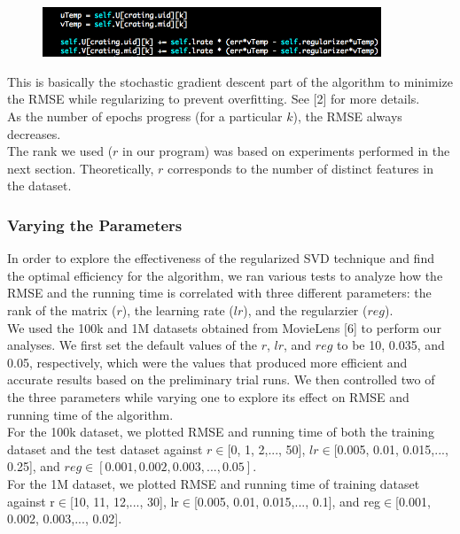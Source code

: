 \documentclass[12pt]{article}
\begin{document}
\begin{figure}[H]
\centering
\includegraphics[width=0.90\textwidth]{graphs/trainkcode}
\end{figure}

\noindent This is basically the stochastic gradient descent part of the algorithm
to minimize the RMSE while regularizing to prevent overfitting. 
See [2] for more details. \\

\noindent As the number of epochs progress (for a particular $k$), the RMSE always decreases.\\

\noindent The rank we used ($r$ in our program) was based on 
experiments performed in the next section. Theoretically, $r$ corresponds
to the number of distinct features in the dataset. 


\subsubsection*{Varying the Parameters}

In order to explore the effectiveness of the regularized SVD technique and find
the optimal efficiency for the algorithm, we ran various tests to analyze how the
RMSE and the running time is correlated with three different parameters: the
rank of the matrix ($r$), the learning rate ($lr$), and the regularzier 
($reg$).\\

\noindent We used the 100k and 1M datasets obtained from MovieLens [6] to perform our analyses.
We first set the default values of the $r$, $lr$, and $reg$ to be 10, 0.035, and 0.05,
respectively, which were the values that produced more efficient and accurate
results based on the preliminary trial runs. We then controlled two of the three
parameters while varying one to explore its effect on RMSE and running time of
the algorithm.\\

\noindent For the 100k dataset, we plotted RMSE and running time of both the training dataset
and the test dataset against $r\in$[0, 1, 2,..., 50], $lr\in$[0.005, 0.01, 0.015,..., 0.25], 
and $reg\in[0.001, 0.002, 0.003,..., 0.05]$.\\

\noindent For the 1M dataset, we plotted RMSE and running time of training dataset 
against r$\in$[10, 11, 12,..., 30], lr$\in$[0.005, 0.01, 0.015,..., 0.1], and
reg$\in$[0.001, 0.002, 0.003,..., 0.02].\\
\end{document}
